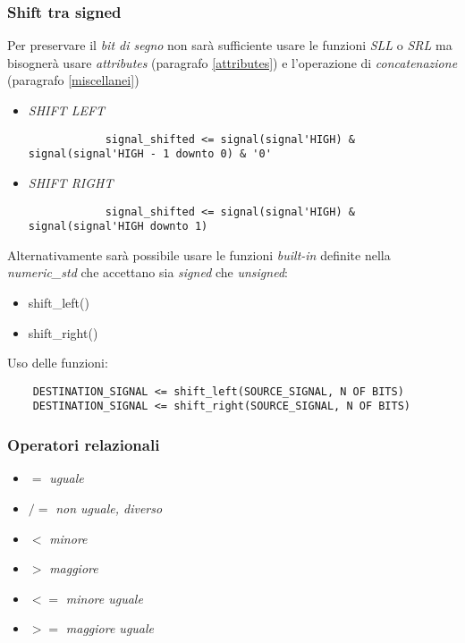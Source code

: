 \documentclass{article}
\begin{document}
\subsubsection{Shift tra signed} \label{signedshift}
Per preservare il \textit{bit di segno} non sarà sufficiente usare le funzioni \textit{SLL} o \textit{SRL} ma bisognerà usare \textit{attributes} (paragrafo \ref{attributes}) e l'operazione di \textit{concatenazione} (paragrafo \ref{miscellanei})

\begin{itemize}
	\item \textit{SHIFT LEFT}
		\begin{verbatim}
		    signal_shifted <= signal(signal'HIGH) & signal(signal'HIGH - 1 downto 0) & '0'
		\end{verbatim}
	\item \textit{SHIFT RIGHT}
		\begin{verbatim}
		    signal_shifted <= signal(signal'HIGH) & signal(signal'HIGH downto 1)
		\end{verbatim}
\end{itemize}

Alternativamente sarà possibile usare le funzioni \textit{built-in} definite nella \textit{numeric\_std} che accettano sia \textit{signed} che \textit{unsigned}:
\begin{itemize}
	\item shift\_left()
	\item shift\_right()
\end{itemize}

Uso delle funzioni:
\begin{verbatim}
    DESTINATION_SIGNAL <= shift_left(SOURCE_SIGNAL, N OF BITS)
    DESTINATION_SIGNAL <= shift_right(SOURCE_SIGNAL, N OF BITS)
\end{verbatim}
\subsubsection{Operatori relazionali}
\begin{itemize}
	\item \(=\) \textit{uguale}
	\item \(/=\) \textit{non uguale, diverso}
	\item \(<\) \textit{minore}
	\item \(>\) \textit{maggiore}
	\item \(<=\) \textit{minore uguale}
	\item \(>=\) \textit{maggiore uguale}
\end{itemize}
\end{document}
